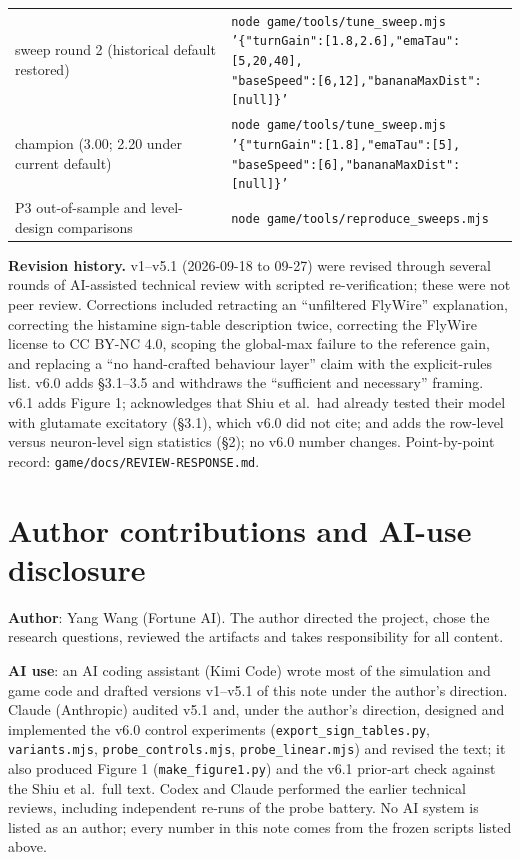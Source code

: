 \documentclass[11pt,a4paper]{article}
\begin{document}
\begin{sloppypar}
\begin{center}
\begin{tabular}{L{7.4cm} L{7.4cm}}
sweep round 2 (historical default restored) & \texttt{node game/tools/tune\_sweep.mjs\newline '\{"turnGain":[1.8,2.6],"emaTau":[5,20,40],\newline "baseSpeed":[6,12],"bananaMaxDist":[null]\}'} \\
champion (3.00; 2.20 under current default) & \texttt{node game/tools/tune\_sweep.mjs\newline '\{"turnGain":[1.8],"emaTau":[5],\newline "baseSpeed":[6],"bananaMaxDist":[null]\}'} \\
P3 out-of-sample and level-design comparisons & \texttt{node game/tools/reproduce\_sweeps.mjs} \\
\bottomrule
\end{tabular}
\end{center}
\end{sloppypar}

\textbf{Revision history.} v1--v5.1 (2026-09-18 to 09-27) were revised through
several rounds of AI-assisted technical review with scripted re-verification;
these were not peer review. Corrections included retracting an ``unfiltered
FlyWire'' explanation, correcting the histamine sign-table description twice,
correcting the FlyWire license to CC BY-NC 4.0, scoping the global-max failure
to the reference gain, and replacing a ``no hand-crafted behaviour layer''
claim with the explicit-rules list. v6.0 adds \S3.1--3.5 and withdraws the
``sufficient and necessary'' framing. v6.1 adds Figure 1; acknowledges that
Shiu et al.\ had already tested their model with glutamate excitatory (\S3.1),
which v6.0 did not cite; and adds the row-level versus neuron-level sign
statistics (\S2); no v6.0 number changes. Point-by-point record:
\texttt{game/docs/REVIEW-RESPONSE.md}.

\section*{Author contributions and AI-use disclosure}

\textbf{Author}: Yang Wang (Fortune AI). The author directed the project,
chose the research questions, reviewed the artifacts and takes responsibility
for all content.

\textbf{AI use}: an AI coding assistant (Kimi Code) wrote most of the
simulation and game code and drafted versions v1--v5.1 of this note under the
author's direction. Claude (Anthropic) audited v5.1 and, under the author's
direction, designed and implemented the v6.0 control experiments
(\texttt{export\_sign\_tables.py}, \texttt{variants.mjs},
\texttt{probe\_controls.mjs}, \texttt{probe\_linear.mjs}) and revised the text;
it also produced Figure 1 (\texttt{make\_figure1.py}) and the v6.1 prior-art
check against the Shiu et al.\ full text. Codex and Claude performed the earlier technical reviews, including
independent re-runs of the probe battery. No AI system is listed as an author;
every number in this note comes from the frozen scripts listed above.
\end{document}
